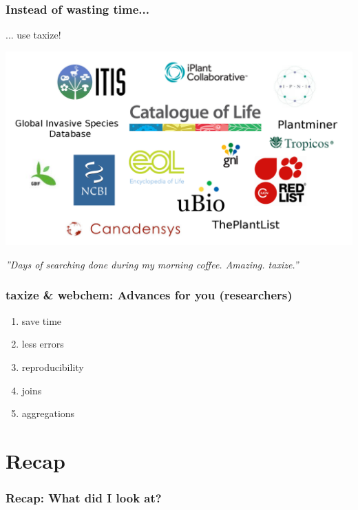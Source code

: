\documentclass[
	10pt
	]{beamer}
\begin{document}
{%
\begin{frame}
\frametitle{Instead of wasting time...}
	... use \alert{taxize!} \\
		\hspace*{-2cm}
		\begin{center}
		\includegraphics[height=0.6\textheight]{figs/sources_taxize.png}
		\end{center}

	\pause
	\emph{''Days of searching done during my morning coffee. Amazing. \alert{taxize}.''}
\end{frame}
}


\begin{frame}
\frametitle{taxize \& webchem: Advances for you (researchers)}
	\begin{enumerate}
		\item save time %
		\item less errors
		\item reproducibility
		\item joins
		\item aggregations
	\end{enumerate}
\end{frame}


\section*{Recap}

\begin{frame}
\frametitle{Recap: What did I look at?}
 \resizebox{11.5cm}{!}{%
				
				}
\end{frame}
\end{document}
